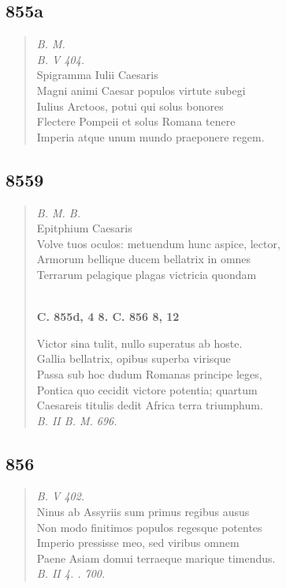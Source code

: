 \documentclass[11pt, a4paper]{report}
\begin{document}
            \subsection*{855a}
      \begin{verse}
      \textit{B. M.} \\ \textit{B. V 404.} \\ Spigramma Iulii Caesaris \\ Magni animi Caesar populos virtute subegi \\ Iulius Arctoos, potui qui solus bonores \\ Flectere Pompeii et solus Romana tenere \\ Imperia atque unum mundo praeponere regem. \\ 
      \end{verse}
  
            \subsection*{8559}
      \begin{verse}
      \textit{B. M. B.} \\ Epitphium Caesaris \\ Volve tuos oculos: metuendum hunc aspice, lector, \\ Armorum bellique ducem bellatrix in omnes \\ Terrarum pelagique plagas victricia quondam \\ 
        ﻿\pagebreak 
    \begin{center} \textbf{C. 855d, 4 8. C. 856 8, 12} \end{center} \marginpar{[311]} Victor sina tulit, nullo superatus ab hoste. \\ Gallia bellatrix, opibus superba virisque \\ Passa sub hoc dudum Romanas principe leges, \\ Pontica quo cecidit victore potentia; quartum \\ Caesareis titulis dedit Africa terra triumphum. \\ \textit{B. II B. M. 696.} \\ 
      \end{verse}
  
            \subsection*{856}
      \begin{verse}
      \textit{B. V 402.} \\ Ninus ab Assyriis sum primus regibus ausus \\ Non modo finitimos populos regesque potentes \\ Imperio pressisse meo, sed viribus omnem \\ Paene Asiam domui terraeque marique timendus. \\ \textit{B. II 4. . 700.} \\ 
      \end{verse}
  
\end{document}
